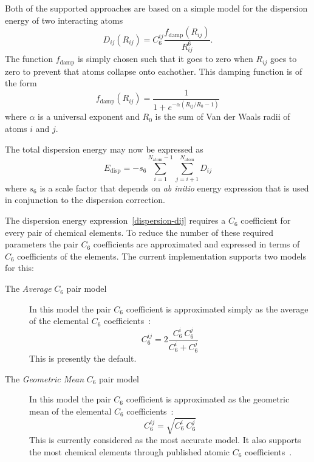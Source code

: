 \documentclass[11pt,fleqn]{article}
\begin{document}
Both of the supported approaches are based on a simple
model for the dispersion energy of two interacting atoms
\begin{equation}
D_{ij}(R_{ij}) = C_6^{ij}\frac{f_{\mathrm{damp}}(R_{ij})}{R^{6}_{ij}}.
\label{dispersion-dij}
\end{equation}
The function $f_{\mathrm{damp}}$ is simply chosen such that it goes to zero
when $R_{ij}$ goes to zero to prevent that atoms collapse onto eachother.
This damping function is of the form
\begin{equation}
f_{\mathrm{damp}}(R_{ij}) = \frac{1}{1+e^{-\alpha\left(R_{ij}/R_0-1\right)}}
\label{dispersion-damping}
\end{equation}
where $\alpha$ is a universal exponent and $R_0$ is the sum of Van der Waals
radii of atoms $i$ and $j$. 

The total dispersion energy may now be expressed as
\begin{equation}
E_{\mathrm{disp}} = -s_6 \sum_{i=1}^{N_{\mathrm{atom}}-1}
                         \sum_{j=i+1}^{N_{\mathrm{atom}}} D_{ij}
\end{equation}
where $s_6$ is a scale factor that depends on {\it ab initio} energy expression
that is used in conjunction to the dispersion correction.

The dispersion energy expression~\ref{dispersion-dij} requires a $C_6$
coefficient for every pair of chemical elements. To reduce the number of these
required parameters the pair $C_6$ coefficients are approximated and expressed
in terms of $C_6$ coefficients of the elements. The current implementation
supports two models for this:
\begin{description}
\item[The {\em Average} $C_6$ pair model]
     In this model the pair $C_6$ coefficient is approximated simply as the
     average of the elemental $C_6$ coefficients~\cite{grimme04}:
     \begin{equation}
        C_6^{ij} = 2\frac{C_6^i~C_6^j}{C_6^i + C_6^j}
        \label{average-c6-pair-model}
     \end{equation}
     This is presently the default.
\item[The {\em Geometric Mean} $C_6$ pair model]
     In this model the pair $C_6$ coefficient is approximated as the
     geometric mean of the elemental $C_6$
     coefficients~\cite{grimme06,antony06}:
     \begin{equation}
        C_6^{ij} = \sqrt{C_6^i~C_6^j}
        \label{geometric-c6-pair-model}
     \end{equation}
     This is currently considered as the most accurate model. It also supports
     the most chemical elements through published atomic $C_6$
     coefficients~\cite{grimme06}.
\end{description}
\end{document}
